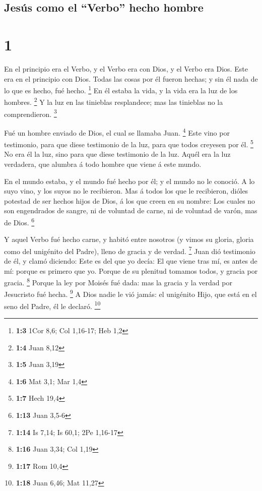 \hypertarget{jesuxfas-como-el-verbo-hecho-hombre}{%
\subsection{Jesús como el ``Verbo'' hecho
hombre}\label{jesuxfas-como-el-verbo-hecho-hombre}}

\hypertarget{section}{%
\section{1}\label{section}}

 En el principio era el Verbo, y el Verbo era con Dios, y el
Verbo era Dios.  Este era en el principio con Dios.
 Todas las cosas por él fueron hechas; y sin él nada de lo
que es hecho, fué hecho. \footnote{\textbf{1:3} 1Cor 8,6; Col 1,16-17;
  Heb 1,2}  En él estaba la vida, y la vida era la luz de
los hombres. \footnote{\textbf{1:4} Juan 8,12}  Y la luz en
las tinieblas resplandece; mas las tinieblas no la comprendieron.
\footnote{\textbf{1:5} Juan 3,19}

 Fué un hombre enviado de Dios, el cual se llamaba Juan.
\footnote{\textbf{1:6} Mat 3,1; Mar 1,4}  Este vino por
testimonio, para que diese testimonio de la luz, para que todos creyesen
por él. \footnote{\textbf{1:7} Hech 19,4}  No era él la luz,
sino para que diese testimonio de la luz.  Aquél era la luz
verdadera, que alumbra á todo hombre que viene á este mundo.

 En el mundo estaba, y el mundo fué hecho por él; y el
mundo no le conoció.  A lo suyo vino, y los suyos no le
recibieron.  Mas á todos los que le recibieron, dióles
potestad de ser hechos hijos de Dios, á los que creen en su nombre:
 Los cuales no son engendrados de sangre, ni de voluntad de
carne, ni de voluntad de varón, mas de Dios. \footnote{\textbf{1:13}
  Juan 3,5-6}

 Y aquel Verbo fué hecho carne, y habitó entre nosotros (y
vimos su gloria, gloria como del unigénito del Padre), lleno de gracia y
de verdad. \footnote{\textbf{1:14} Is 7,14; Is 60,1; 2Pe 1,16-17}
 Juan dió testimonio de él, y clamó diciendo: Este es del
que yo decía: El que viene tras mí, es antes de mí: porque es primero
que yo.  Porque de su plenitud tomamos todos, y gracia por
gracia. \footnote{\textbf{1:16} Juan 3,34; Col 1,19} 
Porque la ley por Moisés fué dada: mas la gracia y la verdad por
Jesucristo fué hecha. \footnote{\textbf{1:17} Rom 10,4}  A
Dios nadie le vió jamás: el unigénito Hijo, que está en el seno del
Padre, él le declaró. \footnote{\textbf{1:18} Juan 6,46; Mat 11,27}

